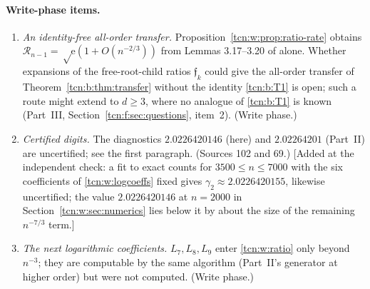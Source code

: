 \documentclass[11pt,letterpaper]{article}
\newcommand{\ee}{\mathrm e}
\theoremstyle{remark}
\begin{document}
\paragraph{Write-phase items.}
\begin{enumerate}[itemsep=2pt]
\item \emph{An identity-free all-order transfer.} Proposition~\ref{tcn:w:prop:ratio-rate} obtains $\mathcal R_{n-1}=\sqrt\ee(1+O(n^{-2/3}))$ from Lemmas 3.17--3.20 of \cite{Chang2024} alone. Whether expansions of the free-root-child ratios $\mathfrak f_k$ could give the all-order transfer of Theorem~\ref{tcn:b:thm:transfer} without the identity \eqref{tcn:b:T1} is open; such a route might extend to $d\ge3$, where no analogue of \eqref{tcn:b:T1} is known (Part~III, Section~\ref{tcn:f:sec:questions}, item~2). (Write phase.)
\item \emph{Certified digits.} The diagnostics $2.0226420146$ (here) and $2.02264201$ (Part~II) are uncertified; see the first paragraph. (Sources 102 and 69.) \textup{[}Added at the independent check: a fit to exact counts for $3500\le n\le7000$ with the six coefficients of \eqref{tcn:w:logcoeffs} fixed gives $\gamma_2\approx2.0226420155$, likewise uncertified; the value $2.0226420146$ at $n=2000$ in Section~\ref{tcn:w:sec:numerics} lies below it by about the size of the remaining $n^{-7/3}$ term.\textup{]}
\item \emph{The next logarithmic coefficients.} $L_7,L_8,L_9$ enter \eqref{tcn:w:ratio} only beyond $n^{-3}$; they are computable by the same algorithm (Part~II's generator at higher order) but were not computed. (Write phase.)
\end{enumerate}
\end{document}

